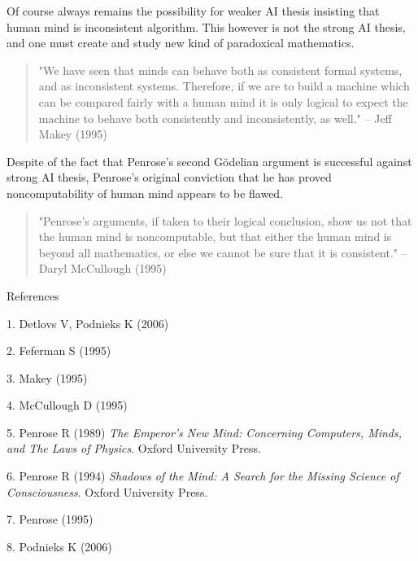 \documentclass[12pt]{article}
\begin{document}
Of course always remains the possibility for weaker AI thesis insisting that human mind is inconsistent algorithm. This however is not the strong AI thesis, and one must create and study new kind of paradoxical mathematics.

\begin{verse}
"We have seen that minds can behave both as consistent formal systems, and as inconsistent systems. Therefore, if we are to build a machine which can be compared fairly with a human mind it is only logical to expect the machine to behave both consistently and inconsistently, as well." -- Jeff Makey (1995)
\end{verse}

Despite of the fact that Penrose's second G\"odelian argument is successful against strong AI thesis, Penrose's original conviction that he has proved noncomputability of human mind appears to be flawed.

\begin{verse}"Penrose's arguments, if taken to their logical conclusion, show us not that the human mind is noncomputable, but that either the human mind is beyond all mathematics, or else we cannot be sure that it is consistent." --Daryl McCullough (1995)
\end{verse}

References

1. Detlovs V, Podnieks K (2006)  

2. Feferman S (1995) 

3. Makey (1995) 

4. McCullough D (1995) 

5. Penrose R (1989) \emph{The Emperor's New Mind: Concerning
Computers, Minds, and The Laws of Physics}. Oxford University Press.

6. Penrose R (1994) \emph{Shadows of the Mind: A Search
for the Missing Science of Consciousness}. Oxford University Press.

7. Penrose (1995) 

8. Podnieks K (2006) 
\end{document}
